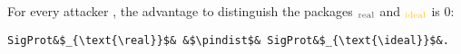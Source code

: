 %
\begin{theorem}\label{theo:indist-signature}
  For every attacker \A, the advantage to distinguish the packages
  \psigprot$_{\text{\real}}$ and \psigprot$_{\text{\ideal}}$ is $0$:
  \begin{center}
    \begin{minipage}{0.5\columnwidth}
    \begin{verbatim}
SigProt&$_{\text{\real}}$& &$\pindist$& SigProt&$_{\text{\ideal}}$&.
    \end{verbatim}
    \end{minipage}
    \end{center}
\end{theorem} 

